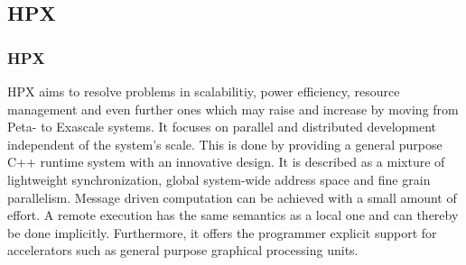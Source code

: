 \subsection{HPX}
\label{subsec:HPX}
\subsubsection{HPX}
  
  HPX aims to resolve problems in scalabilitiy, power efficiency, resource management and even further ones which may raise and increase by moving from Peta- to Exascale systems.
  It focuses on parallel and distributed development independent of the system's scale.
  This is done by providing a general purpose C++ runtime system with an innovative design.
  It is described as a mixture of lightweight synchronization, global system-wide address space and fine grain parallelism.
  Message driven computation can be achieved with a small amount of effort.
  A remote execution has the same semantics as a local one and can thereby be done implicitly.
  Furthermore, it offers the programmer explicit support for accelerators such as general purpose graphical processing units.~\cite{Kaiser.2014}
  
